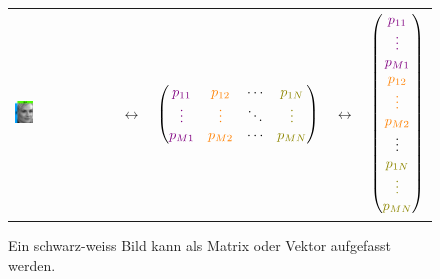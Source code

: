 \begin{figure}[ht]
	\centering
	\begin{tabular}{m{3.5cm} m{1cm} c m{1cm} c}
		\includegraphics[width=0.2\textwidth]{images/vectormatrix/ImageToVector} &
		$\longleftrightarrow$ &
		$\begin{pmatrix}
			\textcolor{violet}{p_{11}} & \textcolor{orange}{p_{12}} & \cdots & \textcolor{olive}{p_{1N}} \\
			\textcolor{violet}{\vdots} & \textcolor{orange}{\vdots} & \ddots & \textcolor{olive}{\vdots} \\
			\textcolor{violet}{p_{M1}} & \textcolor{orange}{p_{M2}} & \cdots &  \textcolor{olive}{p_{MN}} \\
		\end{pmatrix}$ &
		$\longleftrightarrow$ &
		$\begin{pmatrix}
			\textcolor{violet}{p_{11}} \\
			\textcolor{violet}{\vdots} \\
			\textcolor{violet}{p_{M1}} \\
			\textcolor{orange}{p_{12}} \\
			\textcolor{orange}{\vdots} \\
			\textcolor{orange}{p_{M2}} \\
			\vdots \\
			\textcolor{olive}{p_{1N}} \\
			\textcolor{olive}{\vdots} \\
			\textcolor{olive}{p_{MN}} \\
		\end{pmatrix}$
	\end{tabular}
	\caption{Ein schwarz-weiss Bild kann als Matrix oder Vektor aufgefasst werden.}
	\label{fig:image_to_vector}
\end{figure}
